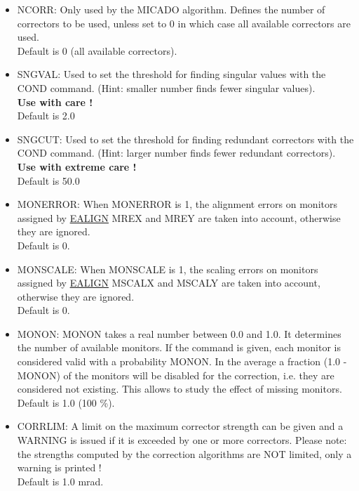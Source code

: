 \begin{itemize}
   \item NCORR: Only used by the MICADO algorithm. Defines the number of
     correctors to be used, unless set to 0 in which case all available
     correctors are used.  
     \\ Default is 0 (all available correctors). 

   \item SNGVAL:  Used to set the threshold for finding singular values
     with the COND command. (Hint: smaller number finds fewer singular
     values).  
     \\ {\bf Use with care ! }
     \\ Default is 2.0 

   \item SNGCUT:  Used to set the threshold for finding redundant
     correctors with the COND command. (Hint: larger number finds fewer
     redundant correctors).  
     \\ {\bf Use with extreme care ! }
     \\ Default is 50.0 

   \item MONERROR: When MONERROR is 1, the alignment errors on monitors
     assigned  by \href{../error/error_align.html}{EALIGN} MREX and MREY
     are taken into account, otherwise they are ignored.  
     \\ Default is 0. 

   \item MONSCALE: When MONSCALE is 1, the scaling errors on monitors
     assigned  by \href{../error/error_align.html}{EALIGN} MSCALX and
     MSCALY are taken into account, otherwise they are ignored.  
     \\ Default is 0. 

   \item MONON: MONON takes a real number between 0.0 and 1.0. It
     determines the number of available monitors. If the command is
     given, each monitor is considered valid with a probability
     MONON. In the average a fraction (1.0 - MONON) of the monitors will
     be disabled for the correction, i.e. they are considered  not
     existing.  This allows to study the effect of missing monitors.  
     \\ Default is 1.0 (100 \%). 

   \item CORRLIM:  A limit on the maximum corrector strength can be
     given and a WARNING is issued if it is exceeded by one or more
     correctors.  Please note: the strengths computed by the correction
     algorithms are NOT limited, only a warning is printed ! 
     \\ Default is 1.0 mrad. \\


\end{itemize}
